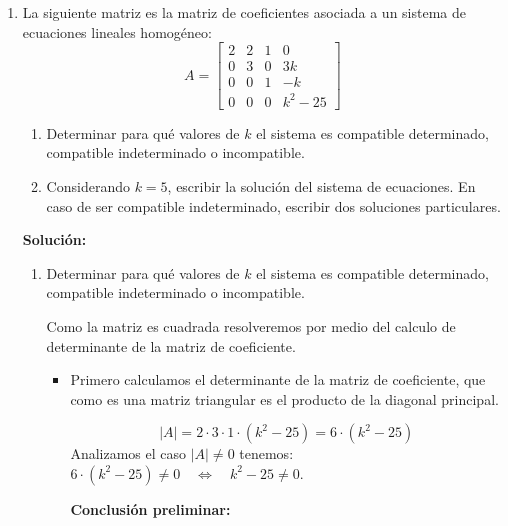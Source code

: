 \documentclass[11pt]{article}
\begin{document}
\begin{enumerate}[\hspace{-5mm} 1) ]
\begin{enumerate}[a)]
\end{enumerate}



\bigskip 











    \item La siguiente matriz es la matriz de coeficientes asociada a un sistema de ecuaciones lineales homogéneo:
\[
A =
\begin{bmatrix}
2 & 2 & 1 & 0 \\
0 & 3 & 0 & 3k \\
0 & 0 & 1 & -k \\
0 & 0 & 0 & k^2 - 25
\end{bmatrix}
\]

\begin{enumerate}
    \item[a)] Determinar para qué valores de $k$ el sistema es compatible determinado, compatible indeterminado o incompatible.
    \item[b)] Considerando $k = 5$, escribir la solución del sistema de ecuaciones. En caso de ser compatible indeterminado, escribir dos soluciones particulares.
\end{enumerate}






\textbf{Solución:}

\begin{enumerate}
    \item[a)] Determinar para qué valores de $k$ el sistema es compatible determinado, compatible indeterminado o incompatible.

Como la matriz es cuadrada resolveremos por medio del calculo de determinante de la matriz de coeficiente. 

\begin{itemize}
    \item Primero calculamos el determinante de  la matriz de coeficiente, que como es una matriz triangular es el producto de la diagonal principal. 

    \[
    |A| = 2\cdot 3 \cdot 1 \cdot (k^2 -25) =6 \cdot (k^2 -25)
    \]
Analizamos el caso $|A| \neq 0$ tenemos: \quad$6 \cdot (k^2 -25) \neq 0 \quad \Longleftrightarrow \quad k^2 - 25 \neq 0 $.




\textbf{Conclusión preliminar:}



\end{itemize}
\end{enumerate}
\end{enumerate}
\end{document}
